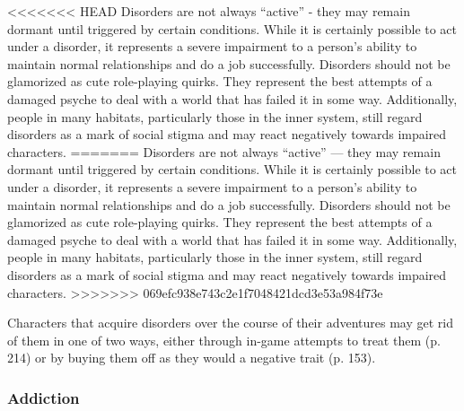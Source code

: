 <<<<<<< HEAD
Disorders are not always ``active” - they may remain dormant until triggered by certain conditions. While it is certainly possible to act under a disorder, it represents a severe impairment to a person’s ability to maintain normal relationships and do a job successfully. Disorders should not be glamorized as cute role-playing quirks. They represent the best attempts of a damaged psyche to deal with a world that has failed it in some way. Additionally, people in many habitats, particularly those in the inner system, still regard disorders as a mark of social stigma and may react negatively towards impaired characters.
=======
Disorders are not always ``active'' --- they may remain dormant until triggered by certain conditions. While it is certainly possible to act under a disorder, it represents a severe impairment to a person’s ability to maintain normal relationships and do a job successfully. Disorders should not be glamorized as cute role-playing quirks. They represent the best attempts of a damaged psyche to deal with a world that has failed it in some way. Additionally, people in many habitats, particularly those in the inner system, still regard disorders as a mark of social stigma and may react negatively towards impaired characters.
>>>>>>> 069efc938e743c2e1f7048421dcd3e53a984f73e

Characters that acquire disorders over the course of their adventures may get rid of them in one of two ways, either through in-game attempts to treat them (p. 214) or by buying them off as they would a negative trait (p. 153).

\subsubsection{Addiction}

